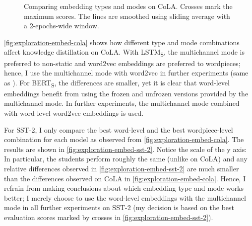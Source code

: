 \documentclass[bsc,frontabs,singlespacing,parskip,deptreport]{infthesis}
\def\BERTS{BERT\textsubscript{S}}
\def\LSTMS{LSTM\textsubscript{S}}
\def\sliding{The lines are smoothed using sliding average with a 2-epochs-wide window.}
\begin{document}
{{{      \begin{figure}[h!t]
        \centering
        \caption{Comparing embedding types and modes on CoLA. Crosses mark the maximum scores. \sliding}
        \label{fig:exploration-embed-cola}
      \end{figure}

      \autoref{fig:exploration-embed-cola} shows how different type and mode combinations affect knowledge distillation on CoLA. With \LSTMS, the multichannel mode is preferred to non-static and word2vec embeddings are preferred to wordpieces; hence, I use the multichannel mode with word2vec in further experiments (same as \citet{Tang_2019b}). For \BERTS, the differences are smaller, yet it is clear that word-level embeddings benefit from using the frozen and unfrozen versions provided by the multichannel mode. In further experiments, the multichannel mode combined with word-level word2vec embeddings is used.

      For SST-2, I only compare the best word-level and the best wordpiece-level combination for each model as observed from \autoref{fig:exploration-embed-cola}. The results are shown in \autoref{fig:exploration-embed-sst-2}. Notice the scale of the y axis: In particular, the students perform roughly the same (unlike on CoLA) and any relative differences observed in \autoref{fig:exploration-embed-sst-2} are much smaller than the differences observed on CoLA in \autoref{fig:exploration-embed-cola}. Hence, I refrain from making conclusions about which embedding type and mode works better; I merely choose to use the word-level embeddings with the multichannel mode in all further experiments on SST-2 (my decision is based on the best evaluation scores marked by crosses in \autoref{fig:exploration-embed-sst-2}).

}}}
\end{document}
